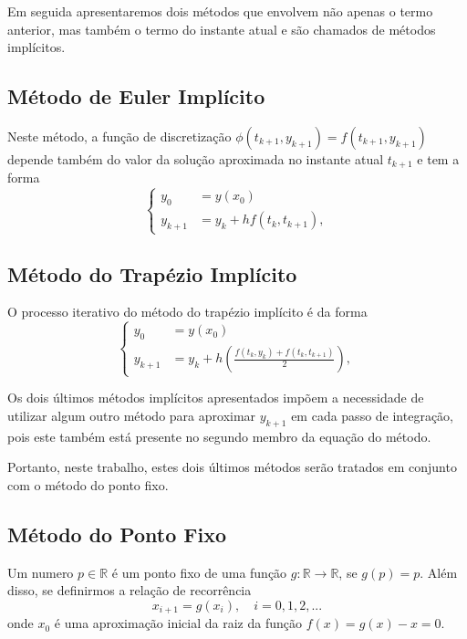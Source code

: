 \documentclass[twocolumn,amsmath,amssymb,floatfix]{revtex4}
\begin{document}
Em seguida apresentaremos dois métodos que envolvem não apenas o termo anterior, mas também o termo do instante atual e são chamados de métodos implícitos.

\subsection{Método de Euler Implícito}
Neste método, a função de discretização $\phi(t_{k+1},y_{k+1})=f(t_{k+1},y_{k+1})$ depende também do valor da solução aproximada no instante atual $t_{k+1}$ e tem a forma
\begin{equation}
\left\{\begin{array}{rl}
    y_0 &= y(x_0)  \\
    y_{k+1} &= y_{k}+hf(t_k,t_{k+1}),
\end{array}\right.
\end{equation}

\subsection{Método do Trapézio Implícito}
O processo iterativo do método do trapézio implícito é da forma
\begin{equation}
\left\{\begin{array}{rl}
    y_0 &= y(x_0)  \\
    y_{k+1} &= y_{k}+h\left( \frac{f(t_k,y_k)+f(t_k,t_{k+1})}{2}\right),
\end{array}\right.
\end{equation}

Os dois últimos métodos implícitos apresentados impõem a necessidade de utilizar algum outro método para aproximar $y_{k+1}$ em cada passo de integração, pois este também está presente no segundo membro da equação do método.

Portanto, neste trabalho, estes dois últimos métodos serão tratados em conjunto com o método do ponto fixo.

\subsection{Método do Ponto Fixo}
Um numero $p\in\mathbb{R}$ é um ponto fixo de uma função $g:\mathbb{R}\to\mathbb{R}$, se $g(p)=p$.
Além disso, se definirmos a relação de recorrência
\begin{equation}
    x_{i+1}=g(x_i),\quad i=0,1,2,...
\end{equation}
onde $x_0$ é uma aproximação inicial da raiz da função $f(x)=g(x)-x=0$.
\end{document}
